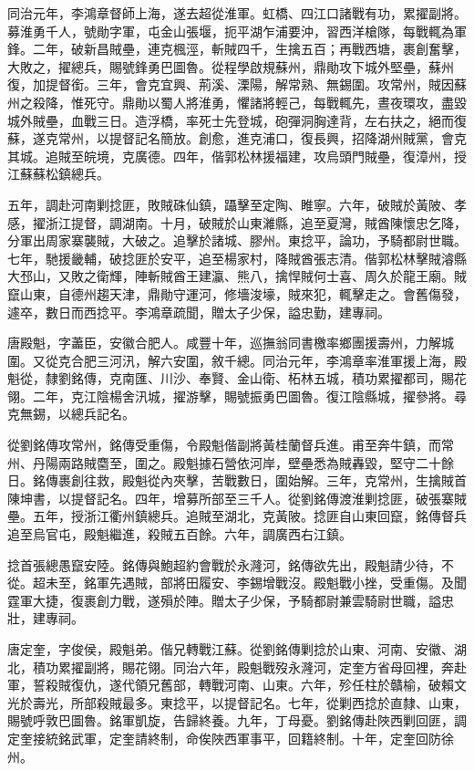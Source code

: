 \begin{pinyinscope}
同治元年，李鴻章督師上海，遂去超從淮軍。虹橋、四江口諸戰有功，累擢副將。募淮勇千人，號勛字軍，屯金山張堰，扼平湖乍浦要沖，習西洋槍隊，每戰輒為軍鋒。二年，破新昌賊壘，連克楓涇，斬賊四千，生擒五百；再戰西塘，裹創奮擊，大敗之，擢總兵，賜號鋒勇巴圖魯。從程學啟規蘇州，鼎勛攻下城外堅壘，蘇州復，加提督銜。三年，會克宜興、荊溪、溧陽，解常熟、無錫圍。攻常州，賊因蘇州之殺降，惟死守。鼎勛以蜀人將淮勇，懼諸將輕己，每戰輒先，晝夜環攻，盡毀城外賊壘，血戰三日。造浮橋，率死士先登城，砲彈洞胸達背，左右扶之，絕而復蘇，遂克常州，以提督記名簡放。創愈，進克浦口，復長興，招降湖州賊黨，會克其城。追賊至皖境，克廣德。四年，偕郭松林援福建，攻烏頭門賊壘，復漳州，授江蘇蘇松鎮總兵。

五年，調赴河南剿捻匪，敗賊硃仙鎮，躡擊至定陶、睢寧。六年，破賊於黃陂、孝感，擢浙江提督，調湖南。十月，破賊於山東濰縣，追至夏灣，賊酋陳懷忠乞降，分軍出周家寨襲賊，大破之。追擊於諸城、膠州。東捻平，論功，予騎都尉世職。七年，馳援畿輔，破捻匪於安平，追至楊家村，降賊酋張志清。偕郭松林擊賊濬縣大邳山，又敗之衛輝，陣斬賊酋王建瀛、熊八，擒悍賊何士喜、周久於龍王廟。賊竄山東，自德州趨天津，鼎勛守運河，修墻浚壕，賊來犯，輒擊走之。會舊傷發，遽卒，數日而西捻平。李鴻章疏聞，贈太子少保，謚忠勤，建專祠。

唐殿魁，字藎臣，安徽合肥人。咸豐十年，巡撫翁同書檄率鄉團援壽州，力解城圍。又從克合肥三河汛，解六安圍，敘千總。同治元年，李鴻章率淮軍援上海，殿魁從，隸劉銘傳，克南匯、川沙、奉賢、金山衛、柘林五城，積功累擢都司，賜花翎。二年，克江陰楊舍汛城，擢游擊，賜號振勇巴圖魯。復江陰縣城，擢參將。尋克無錫，以總兵記名。

從劉銘傳攻常州，銘傳受重傷，令殿魁偕副將黃桂蘭督兵進。甫至奔牛鎮，而常州、丹陽兩路賊麕至，圍之。殿魁據石營依河岸，壁壘悉為賊轟毀，堅守二十餘日。銘傳裹創往救，殿魁從內夾擊，苦戰數日，圍始解。三年，克常州，生擒賊首陳坤書，以提督記名。四年，增募所部至三千人。從劉銘傳渡淮剿捻匪，破張寨賊壘。五年，授浙江衢州鎮總兵。追賊至湖北，克黃陂。捻匪自山東回竄，銘傳督兵追至烏官屯，殿魁繼進，殺賊五百餘。六年，調廣西右江鎮。

捻首張總愚竄安陸。銘傳與鮑超約會戰於永漋河，銘傳欲先出，殿魁請少待，不從。超未至，銘軍先遇賊，部將田履安、李錫增戰沒。殿魁戰小挫，受重傷。及聞霆軍大捷，復裹創力戰，遂殞於陣。贈太子少保，予騎都尉兼雲騎尉世職，謚忠壯，建專祠。

唐定奎，字俊侯，殿魁弟。偕兄轉戰江蘇。從劉銘傳剿捻於山東、河南、安徽、湖北，積功累擢副將，賜花翎。同治六年，殿魁戰歿永漋河，定奎方省母回裡，奔赴軍，誓殺賊復仇，遂代領兄舊部，轉戰河南、山東。六年，殄任柱於贛榆，破賴文光於壽光，所部殺賊最多。東捻平，以提督記名。七年，從剿西捻於直隸、山東，賜號呼敦巴圖魯。銘軍凱旋，告歸終養。九年，丁母憂。劉銘傳赴陜西剿回匪，調定奎接統銘武軍，定奎請終制，命俟陜西軍事平，回籍終制。十年，定奎回防徐州。


\end{pinyinscope}
